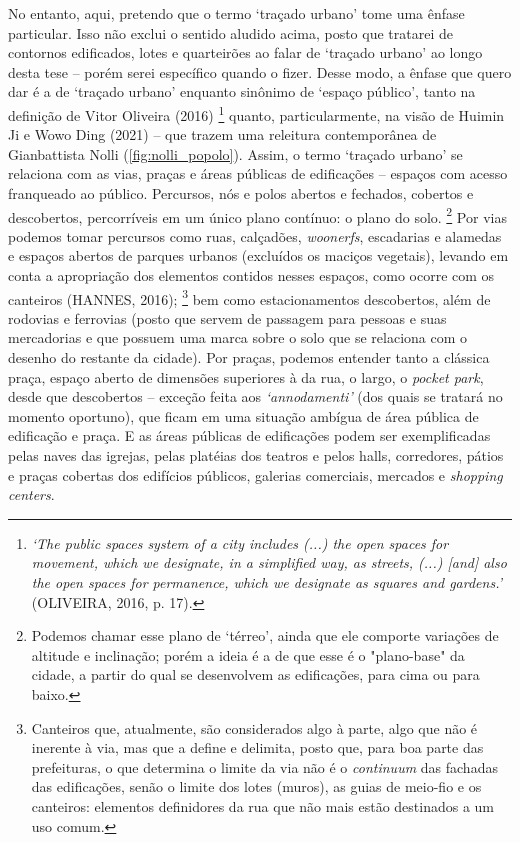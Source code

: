 \documentclass[12pt, a4paper]{book} %
\begin{document}
            No entanto, aqui, pretendo que o termo `traçado urbano' tome uma ênfase particular. Isso não exclui o sentido aludido acima, posto que tratarei de contornos edificados, lotes e quarteirões ao falar de `traçado urbano' ao longo desta tese – porém serei específico quando o fizer. Desse modo, a ênfase que quero dar é a de `traçado urbano' enquanto sinônimo de `espaço público', tanto na definição de Vitor Oliveira (2016)
                \footnote[8]{\textit{`The public spaces system of a city includes (...) the open spaces for movement, which we designate, in a simplified way, as streets, (...) [and] also the open spaces for permanence, which we designate as squares and gardens.'} (OLIVEIRA, 2016, p. 17).} 
            quanto, particularmente, na visão de Huimin Ji e Wowo Ding (2021) – que trazem uma releitura contemporânea de Gianbattista Nolli (\autoref{fig:nolli_popolo}). Assim, o termo `traçado urbano' se relaciona com as vias, praças e áreas públicas de edificações – espaços com acesso franqueado ao público. Percursos, nós e polos abertos e fechados, cobertos e descobertos, percorríveis em um único plano contínuo: o plano do solo.
                \footnote[9]{Podemos chamar esse plano de `térreo', ainda que ele comporte variações de altitude e inclinação; porém a ideia é a de que esse é o "plano-base" da cidade, a partir do qual se desenvolvem as edificações, para cima ou para baixo.} 
            Por vias podemos tomar percursos como ruas, calçadões, \textit{woonerfs}, escadarias e alamedas e espaços abertos de parques urbanos (excluídos os maciços vegetais), levando em conta a apropriação dos elementos contidos nesses espaços, como ocorre com os canteiros (HANNES, 2016);
                \footnote[10]{Canteiros que, atualmente, são considerados algo à parte, algo que não é inerente à via, mas que a define e delimita, posto que, para boa parte das prefeituras, o que determina o limite da via não é o \textit{continuum} das fachadas das edificações, senão o limite dos lotes (muros), as guias de meio-fio e os canteiros: elementos definidores da rua que não mais estão destinados a um uso comum.} 
            bem como estacionamentos descobertos, além de rodovias e ferrovias (posto que servem de passagem para pessoas e suas mercadorias e que possuem uma marca sobre o solo que se relaciona com o desenho do restante da cidade). Por praças, podemos entender tanto a clássica praça, espaço aberto de dimensões superiores à da rua, o largo, o \textit{pocket park}, desde que descobertos – exceção feita aos \textit{`annodamenti'} (dos quais se tratará no momento oportuno), que ficam em uma situação ambígua de área pública de edificação e praça. E as áreas públicas de edificações podem ser exemplificadas pelas naves das igrejas, pelas platéias dos teatros e pelos halls, corredores, pátios e praças cobertas dos  edifícios públicos, galerias comerciais, mercados e \textit{shopping centers}.
\end{document}
